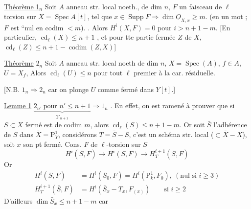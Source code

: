 \uline{Théorème 1}$_n$ Soit $A$ anneau str. local noeth., de dim $n$, 
  $F$ un faisceau de $\ell$ torsion sur
$X=\operatorname{Spec} A[t]$,  tel que $x\in\operatorname{Supp} F\Longrightarrow\dim\underline O_{X,x}\geq m$.
(en un mot ; $F$ est ``nul en codim $<m$). .
Alors $H^i(X,F)=0$ pour $i>n+1-m$.
[En particulier, $\operatorname{cd}_{\ell}(X)\leq n+1$\deleted{\unsure{]}} , et pour tte partie fermée $Z$
de $X$,  $\operatorname{cd}_{\ell}(Z)\leq n+1-\operatorname{codim}(Z,X)$]

\uline{Théorème} $2_n$ Soit $A$ anneau str. local noeth de
dim $n$,  $X=\operatorname{Spec}(A)$, $f\in A$, $U=X_f$, Alors
$\operatorname{cd}_{\ell}(U)\leq n$ pour tout $\ell$ premier à la car. résiduelle.

[N.B. $1_n\Rightarrow2_n$ car on plonge $U$ comme fermé  dans $Y[t]$.]

\uline{Lemme 1} $\underbrace{2_{n'}\ \text{pour }n'\leq n+1}_{2'_{n+1}}\Longrightarrow 1_n$
. En effet, on est ramené à
prouver que si $S\subset X$ fermé est de codim $m$,
alors $\operatorname{cd}_{\ell}(S)\leq n+1-m$.  Or soit $\bar S$ l'adhérence de
$S$ dans $\bar X=\mathrm P^1_Y$, considérons $T=\bar S-S$, c'est un
schéma str. local ($\subset\bar X-X$), soit $x$ son pt fermé.
Cons.   $F$ de $\ell$-torsion sur $S$
\[
H^i(\bar S,F)\longrightarrow H^i(S,F)\longrightarrow H_T^{i+1}(\bar S,F)
\]
Or
\[
\begin{aligned}
H^i(\bar S,F)&=H^i(\bar S_0,F)=H^i(\mathrm P^1_k,F_0),\ (\text{nul si }i\geq3)\\
H_T^{i+1}(\bar S,F)&=H^i(\bar S_x-T_x,F_{(x)})\qquad\text{si } i\geq2
\end{aligned}
\]
D'ailleurs $\dim\bar S_x\leq n+1-m$ car 
